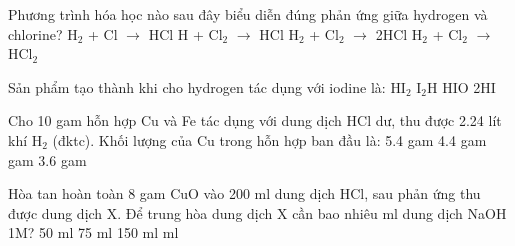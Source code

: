 \documentclass[Main.tex]{subfiles}
\begin{document}
    \begin{ex}
    Phương trình hóa học nào sau đây biểu diễn đúng phản ứng giữa hydrogen và chlorine?
    \choice
    {H$_2$ + Cl $\rightarrow$ HCl}
    {H + Cl$_2$ $\rightarrow$ HCl}
    {\True H$_2$ + Cl$_2$ $\rightarrow$ 2HCl}
    {H$_2$ + Cl$_2$ $\rightarrow$ HCl$_2$}
    \end{ex}
    
    \begin{ex}
    Sản phẩm tạo thành khi cho hydrogen tác dụng với iodine là:
    \choice
    {HI$_2$}
    {I$_2$H}
    {HIO}
    {\True 2HI}
    \end{ex}
    
    \begin{ex}
    Cho 10 gam hỗn hợp Cu và Fe tác dụng với dung dịch HCl dư, thu được 2.24 lít khí H$_2$ (đktc). Khối lượng của Cu trong hỗn hợp ban đầu là:
    \choice
    {5.4 gam}
    {4.4 gam}
    { gam}
    {3.6 gam}
    \end{ex}
    
    \begin{ex}
    Hòa tan hoàn toàn 8 gam CuO vào 200 ml dung dịch HCl, sau phản ứng thu được dung dịch X. Để trung hòa dung dịch X cần bao nhiêu ml dung dịch NaOH 1M?
    \choice
    {50 ml}
    {75 ml}
    {150 ml}
    { ml}
    \end{ex}
    
\end{document}
